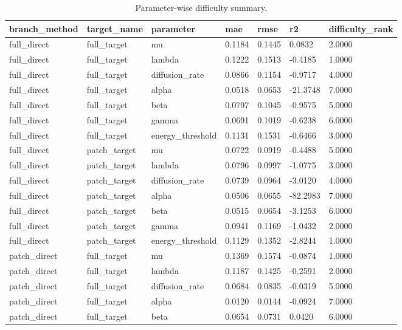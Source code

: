 \begin{table}[t]
\centering
\caption{Parameter-wise difficulty summary.}
\label{tab:paramwise}
\scriptsize
\begin{tabular}{lllllll}
\toprule
branch\_method & target\_name & parameter & mae & rmse & r2 & difficulty\_rank \\
\midrule
full\_direct & full\_target & mu & 0.1184 & 0.1445 & 0.0832 & 2.0000 \\
full\_direct & full\_target & lambda & 0.1222 & 0.1513 & -0.4185 & 1.0000 \\
full\_direct & full\_target & diffusion\_rate & 0.0866 & 0.1154 & -0.9717 & 4.0000 \\
full\_direct & full\_target & alpha & 0.0518 & 0.0653 & -21.3748 & 7.0000 \\
full\_direct & full\_target & beta & 0.0797 & 0.1045 & -0.9575 & 5.0000 \\
full\_direct & full\_target & gamma & 0.0691 & 0.1019 & -0.6238 & 6.0000 \\
full\_direct & full\_target & energy\_threshold & 0.1131 & 0.1531 & -0.6466 & 3.0000 \\
full\_direct & patch\_target & mu & 0.0722 & 0.0919 & -0.4488 & 5.0000 \\
full\_direct & patch\_target & lambda & 0.0796 & 0.0997 & -1.0775 & 3.0000 \\
full\_direct & patch\_target & diffusion\_rate & 0.0739 & 0.0964 & -3.0120 & 4.0000 \\
full\_direct & patch\_target & alpha & 0.0506 & 0.0655 & -82.2983 & 7.0000 \\
full\_direct & patch\_target & beta & 0.0515 & 0.0654 & -3.1253 & 6.0000 \\
full\_direct & patch\_target & gamma & 0.0941 & 0.1169 & -1.0432 & 2.0000 \\
full\_direct & patch\_target & energy\_threshold & 0.1129 & 0.1352 & -2.8244 & 1.0000 \\
patch\_direct & full\_target & mu & 0.1369 & 0.1574 & -0.0874 & 1.0000 \\
patch\_direct & full\_target & lambda & 0.1187 & 0.1425 & -0.2591 & 2.0000 \\
patch\_direct & full\_target & diffusion\_rate & 0.0684 & 0.0835 & -0.0319 & 5.0000 \\
patch\_direct & full\_target & alpha & 0.0120 & 0.0144 & -0.0924 & 7.0000 \\
patch\_direct & full\_target & beta & 0.0654 & 0.0731 & 0.0420 & 6.0000 \\

\end{tabular}
\end{table}

